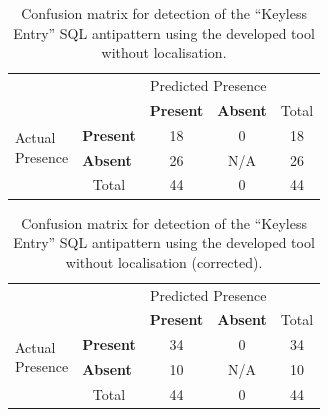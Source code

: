 \begin{table}[H]
    \centering
    \caption{Confusion matrix for detection of the “Keyless Entry” SQL antipattern using the developed tool without localisation.}
    \begin{tabular}{l|l|c|c|c}
        \multicolumn{2}{c}{}&\multicolumn{2}{c}{Predicted Presence}&\\
        \cline{3-4}
        \multicolumn{2}{c|}{}&\textbf{Present}&\textbf{Absent}&\multicolumn{1}{c}{Total}\\
        \cline{2-4}
        \multirow{2}{1.5cm}{Actual\\Presence}& \textbf{Present} & 18 & 0 & 18\\
        \cline{2-4}
        & \textbf{Absent} & 26 & N/A & 26\\
        \cline{2-4}
        \multicolumn{1}{c}{} & \multicolumn{1}{c}{Total} & \multicolumn{1}{c}{44} & \multicolumn{1}{c}{0} & \multicolumn{1}{c}{44}\\
    \end{tabular}
\end{table}

\begin{table}[H]
    \centering
    \caption{Confusion matrix for detection of the “Keyless Entry” SQL antipattern using the developed tool without localisation (corrected).}
    \begin{tabular}{l|l|c|c|c}
        \multicolumn{2}{c}{}&\multicolumn{2}{c}{Predicted Presence}&\\
        \cline{3-4}
        \multicolumn{2}{c|}{}&\textbf{Present}&\textbf{Absent}&\multicolumn{1}{c}{Total}\\
        \cline{2-4}
        \multirow{2}{1.5cm}{Actual\\Presence}& \textbf{Present} & 34 & 0 & 34\\
        \cline{2-4}
        & \textbf{Absent} & 10 & N/A & 10\\
        \cline{2-4}
        \multicolumn{1}{c}{} & \multicolumn{1}{c}{Total} & \multicolumn{1}{c}{44} & \multicolumn{1}{c}{0} & \multicolumn{1}{c}{44}\\
    \end{tabular}
\end{table}

